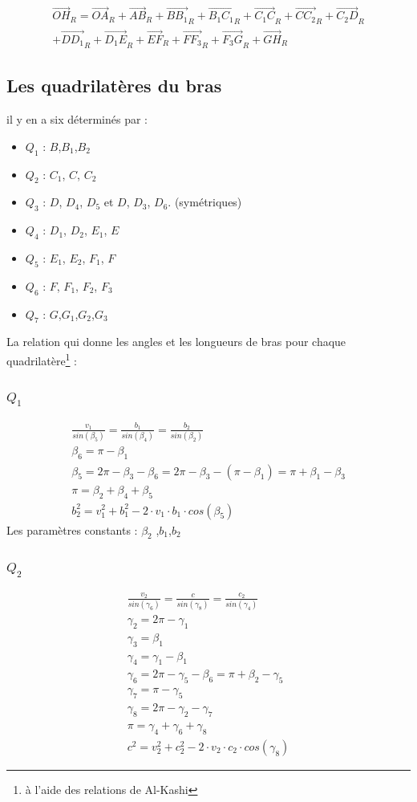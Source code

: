 \documentclass[12pt,a4paper]{article}
\begin{document}
\begin{equation}
\begin{split}
\vec{OH}_R=\vec{OA}_R+\vec{AB}_R+\vec{B B_1}_R+\vec{B_1 C_1}_R+\vec{C_1 C}_R+\vec{C C_2}_R+\vec{C_2 D}_R\\+\vec{D D_1}_R+\vec{D_1 E}_R+\vec{E F}_R+\vec{F F_3}_R+\vec{F_3 G}_R+\vec{G H}_R
\end{split}
\end{equation}

\subsection{Les quadrilatères du bras}
il y en a six déterminés par : 

\begin{itemize}
	\item $Q_1$ : $B$,$B_1$,$B_2$
	\item $Q_2$ : $C_1$, $C$, $C_2$
	\item $Q_3$ : $D$, $D_4$, $D_5$ et $D$, $D_3$, $D_6$. (symétriques)
	\item $Q_4$ : $D_1$, $D_2$, $E_1$, $E$
	\item $Q_5$ : $E_1$, $E_2$, $F_1$, $F$
	\item $Q_6$ : $F$, $F_1$, $F_2$, $F_3$
	\item $Q_7$ : $G$,$G_1$,$G_2$,$G_3$
\end{itemize}

La relation qui donne les angles et les longueurs de bras pour chaque quadrilatère\footnote{à l'aide des relations de Al-Kashi} : 

\subsubsection{$Q_1$}
\begin{eqnarray}
\frac{v_1}{sin(\beta_5)}=\frac{b_1}{sin(\beta_4)}=\frac{b_2}{sin(\beta_2)}\\
\beta_6=\pi-\beta_1\\
\beta_5=2\pi-\beta_3-\beta_6=2\pi-\beta_3-(\pi-\beta_1)=\pi+\beta_1-\beta_3\\
\pi=\beta_2+\beta_4+\beta_5\\
b_2^2=v_1^2+b_1^2- 2 \cdot v_1 \cdot b_1 \cdot cos(\beta_5)
\end{eqnarray}
Les paramètres constants : $\beta_2$ ,$b_1$,$b_2$
\subsubsection{$Q_2$}
\begin{eqnarray}
\frac{v_2}{sin(\gamma_6)}=\frac{c}{sin(\gamma_8)}=\frac{c_2}{sin(\gamma_4)}\\
\gamma_2=2\pi-\gamma_1\\
\gamma_3=\beta_1\\
\gamma_4=\gamma_1-\beta_1\\
\gamma_6=2\pi-\gamma_5-\beta_6=\pi+\beta_2-\gamma_5\\
\gamma_7=\pi-\gamma_5\\
\gamma_8=2\pi-\gamma_2-\gamma_7\\
\pi=\gamma_4+\gamma_6+\gamma_8\\
c^2=v_2^2+c_2^2- 2 \cdot v_2 \cdot c_2 \cdot cos(\gamma_8)
\end{eqnarray}
\end{document}

